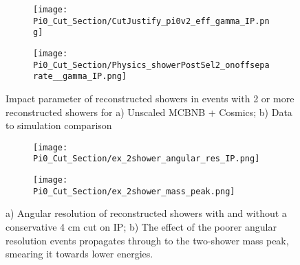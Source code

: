 \begin{figure}[H]
\centering
  \begin{subfigure}[t]{0.35\textwidth}
    \centering
\texttt{[image: Pi0\_Cut\_Section/CutJustify\_pi0v2\_eff\_gamma\_IP.png]}
  \caption{ }
  \end{subfigure} 
  \hspace{20mm}
  \begin{subfigure}[t]{0.35\textwidth}
    \centering
\texttt{[image: Pi0\_Cut\_Section/Physics\_showerPostSel2\_onoffseparate\_\_gamma\_IP.png]}
  \caption{ }
  \end{subfigure} 
\caption{ Impact parameter of reconstructed showers in events with 2 or more reconstructed showers for a) Unscaled MCBNB + Cosmics; b) Data to simulation comparison }
\label{fig:cutjust_pi0_IP}
\end{figure}

\begin{figure}[H]
\centering
  \begin{subfigure}[t]{0.25\textwidth}
    \centering
\texttt{[image: Pi0\_Cut\_Section/ex\_2shower\_angular\_res\_IP.png]}
  \caption{ }
  \end{subfigure} 
  \hspace{40mm}
  \begin{subfigure}[t]{0.25\textwidth}
    \centering
\texttt{[image: Pi0\_Cut\_Section/ex\_2shower\_mass\_peak.png]}
  \caption{ }
  \end{subfigure} 
\caption{ a) Angular resolution of reconstructed showers with and without a conservative 4 cm cut on IP; b) The effect of the poorer angular resolution events propagates through to the two-shower mass peak, smearing it towards lower energies. }
\label{fig:ex_cutjust_IP}
\end{figure}

